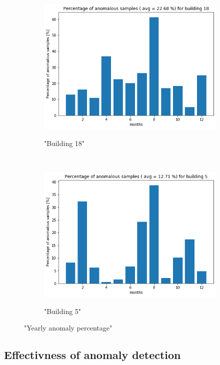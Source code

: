 \begin{figure}[H]
    \begin{subfigure}{.5\textwidth}
		\caption{"Building 18"}
		\includegraphics[width=1\linewidth]{../Figures/EC/b18year.png}
		\label{fig:ec_b18year}
	\end{subfigure}%
    ~ 
    \begin{subfigure}{.5\textwidth}
		\caption{"Building 5"}
		\includegraphics[width=1\linewidth]{../Figures/EC/b5year.png}
		\label{fig:ec_b5year}
	\end{subfigure}%
	\label{fig:ec_year}
	\caption{"Yearly anomaly percentage"}
\end{figure}

\subsection{Effectivness of anomaly detection}

